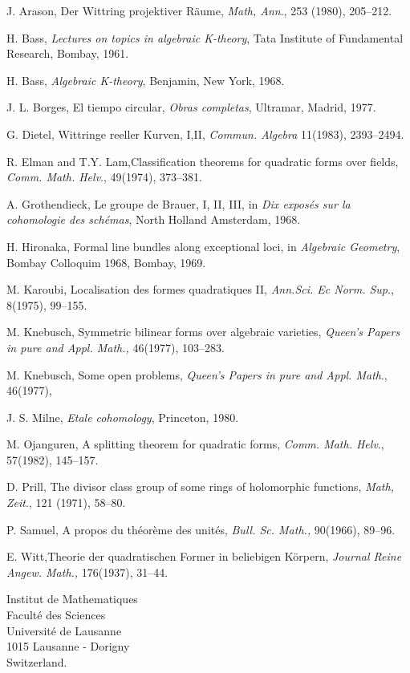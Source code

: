 \begin{thebibliography}{99}
{J. Arason}, Der Wittring projektiver R\"{a}ume, \textit{Math, Ann}., 253 (1980), 205--212.

{H. Bass}, \textit{Lectures on topics in algebraic K-theory}, Tata Institute of Fundamental Research, Bombay, 1961.

{H. Bass}, \textit{Algebraic K-theory}, Benjamin, New York, 1968.

{J. L. Borges}, El tiempo circular, \textit{Obras completas}, Ultramar, Madrid, 1977. 

{G. Dietel}, Wittringe reeller Kurven, I,II, \textit{Commun. Algebra} 11(1983), 2393--2494.

{R. Elman and T.Y. Lam},\pageoriginale Classification theorems for quadratic forms over fields, \textit{Comm. Math. Helv}., 49(1974), 373--381.

{A. Grothendieck}, Le groupe de Brauer, I, II, III, in \textit{Dix expos\'{e}s sur la cohomologie des sch\'{e}mas}, North Holland Amsterdam, 1968.

{H. Hironaka}, Formal line bundles along exceptional loci, in \textit{Algebraic Geometry}, Bombay Colloquim 1968, Bombay, 1969.

{M. Karoubi}, Localisation des formes quadratiques II, \textit{Ann.Sci. Ec Norm. Sup}., 8(1975), 99--155.

{M. Knebusch}, Symmetric bilinear forms over algebraic varieties, \textit{Queen's Papers in pure and Appl. Math.,} 46(1977), 103--283.

{M. Knebusch}, Some open problems, \textit{Queen's Papers in pure and Appl. Math}., 46(1977),

{J. S. Milne}, \textit{Etale cohomology}, Princeton, 1980.

{M. Ojanguren}, A splitting theorem for quadratic forms, \textit{Comm. Math. Helv}., 57(1982), 145--157.

{D. Prill}, The divisor class group of some rings of holomorphic functions, \textit{Math, Zeit}., 121 (1971), 58--80.

{P. Samuel}, A propos du th\'{e}or\`{e}me des unit\'{e}s, \textit{Bull. Sc. Math.,} 90(1966), 89--96.

{E. Witt},\pageoriginale Theorie der quadratischen Former in beliebigen K\"{o}rpern, \textit{Journal Reine Angew. Math.,} 176(1937), 31--44.
\end{thebibliography}

\vskip 1cm

\noindent
Institut de Mathematiques\\
Facult\'e des Sciences\\
Universit\'e de Lausanne\\
1015 Lausanne - Dorigny\\
Switzerland.

\newpage
~\phantom{a}
\thispagestyle{empty}
